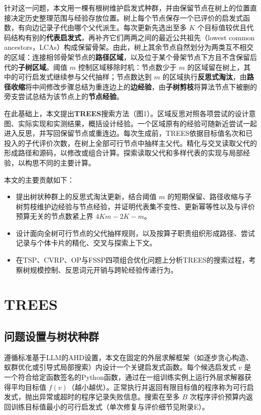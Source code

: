 \documentclass{article}
\begin{document}
针对这一问题，本文用一棵有根树维护启发式种群，并由保留节点在树上的位置直接决定历史整理范围与经验存放位置。树上每个节点保存一个已评价的启发式函数，有向边记录子代由哪个父代派生。每次更新先选出至多 \(K\) 个目标值较优且代码结构有别的\textbf{代表启发式}，再补齐它们两两之间的最近公共祖先（lowest common ancestors，LCAs）构成保留骨架。由此，树上其余节点自然划分为两类互不相交的区域：连接相邻骨架节点的\textbf{路径区域}，以及位于某个骨架节点下方且不含保留后代的\textbf{子树区域}。阈值 \(m\) 控制区域移除时机：节点数少于 \(m\) 的区域留在树上，其中的可行启发式继续参与父代抽样；节点数达到 \(m\) 的区域执行\textbf{反思式淘汰}，由\textbf{路径收缩}将中间修改步骤总结为重连边上的\textbf{边经验}，由\textbf{子树剪枝}将算法节点下被删的旁支尝试总结为该节点上的\textbf{节点经验}。

在此基础上，本文提出\textbf{TREES}搜索方法（图1）。区域反思对照各项尝试的设计意图、实际实现和实测结果，概括设计经验。一个区域原有的经验可随新近尝试一起进入反思，并写回保留节点或重连边。每次生成前，TREES依据目标值名次和已投入的子代评价次数，在树上全部可行节点中抽样主父代。精化与交叉读取父代的形成路径和源码，以修改或组合计算。探索读取父代和多样代表的实现与局部经验，以构思不同的主要计算。

本文的主要贡献如下：

\begin{itemize}
\tightlist
\item
  提出树状种群上的反思式淘汰更新，结合阈值 \(m\) 的短期保留、路径收缩与子树剪枝维护边经验与节点经验，并证明代表集不变性、更新幂等性以及与评价预算无关的节点数紧上界 \(4Km-2K-m\)。
\item
  设计面向全树可行节点的父代抽样规则，以及按算子职责组织形成路径、尝试记录与个体卡片的精化、交叉与探索上下文。
\item
  在TSP、CVRP、OP与FSSP四项组合优化问题上分析TREES的搜索过程，考察树规模控制、反思词元开销与跨轮经验传递行为。
\end{itemize}

\section{TREES}\label{trees}

\subsection{问题设置与树状种群}\label{ux95eeux9898ux8bbeux7f6eux4e0eux6811ux72b6ux79cdux7fa4}

遵循标准基于LLM的AHD设置\citep{eoh, mctsahd}，本文在固定的外层求解框架（如逐步贪心构造、蚁群优化或引导式局部搜索）内设计一个关键启发式函数。每个候选启发式 \(v\) 是一个符合给定函数签名的Python函数，通过在一组训练实例上运行外层求解器获得平均目标值 \(f(v)\)（越小越优）。正常执行并返回有限目标值的程序称为可行启发式，抛出异常或超时的程序记录失败信息。搜索在至多 \(B\) 次程序评价预算内返回训练目标值最小的可行启发式（单次修复与评价细节见附录E）。
\end{document}

